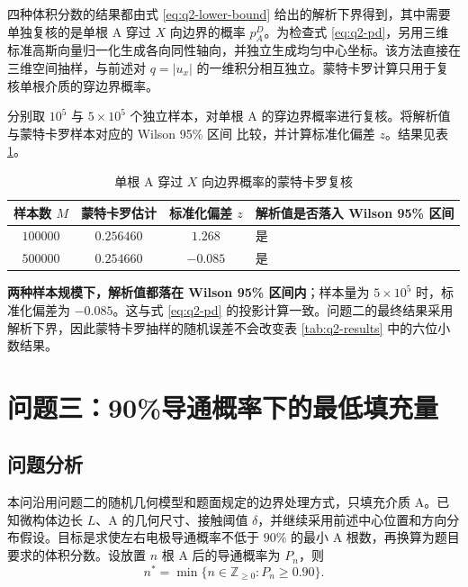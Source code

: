 \documentclass[withoutpreface,bwprint]{cumcmthesis}
\begin{document}
四种体积分数的结果都由式 \eqref{eq:q2-lower-bound} 给出的解析下界得到，其中需要单独复核的是单根 A 穿过 $X$ 向边界的概率 $p_A^D$。为检查式 \eqref{eq:q2-pd}，另用三维标准高斯向量归一化生成各向同性轴向，并独立生成均匀中心坐标。该方法直接在三维空间抽样，与前述对 $q=|u_x|$ 的一维积分相互独立。蒙特卡罗计算只用于复核单根介质的穿边界概率。

分别取 $10^5$ 与 $5\times10^5$ 个独立样本，对单根 A 的穿边界概率进行复核。将解析值与蒙特卡罗样本对应的 Wilson 95\% 区间\cite{wilson1927} 比较，并计算标准化偏差 $z$。结果见表 \ref{tab:q2-verification}。

\begin{table}[H]
\centering
\caption{单根 A 穿过 $X$ 向边界概率的蒙特卡罗复核}
\label{tab:q2-verification}
\begin{tabularx}{0.92\textwidth}{ccc>{\centering\arraybackslash}X}
\toprule
样本数 $M$ & 蒙特卡罗估计 & 标准化偏差 $z$ & 解析值是否落入 Wilson 95\% 区间 \\
\midrule
$100000$ & $0.256460$ & $1.268$ & 是 \\
$500000$ & $0.254660$ & $-0.085$ & 是 \\
\bottomrule
\end{tabularx}
\end{table}

\textbf{两种样本规模下，解析值都落在 Wilson 95\% 区间内}；样本量为 $5\times10^5$ 时，标准化偏差为 $-0.085$。这与式 \eqref{eq:q2-pd} 的投影计算一致。问题二的最终结果采用解析下界，因此蒙特卡罗抽样的随机误差不会改变表 \ref{tab:q2-results} 中的六位小数结果。

\section{问题三：90\%导通概率下的最低填充量}

\subsection{问题分析}

本问沿用问题二的随机几何模型和题面规定的边界处理方式，只填充介质 A。已知微构体边长 $L$、A 的几何尺寸、接触阈值 $\delta$，并继续采用前述中心位置和方向分布假设。目标是求使左右电极导通概率不低于 $90\%$ 的最小 A 根数，再换算为题目要求的体积分数。设放置 $n$ 根 A 后的导通概率为 $P_n$，则
\begin{equation}
 n^*=\min\{n\in\mathbb Z_{\ge 0}:P_n\ge 0.90\}.
 \label{eq:q3-integer-problem}
\end{equation}
\end{document}
